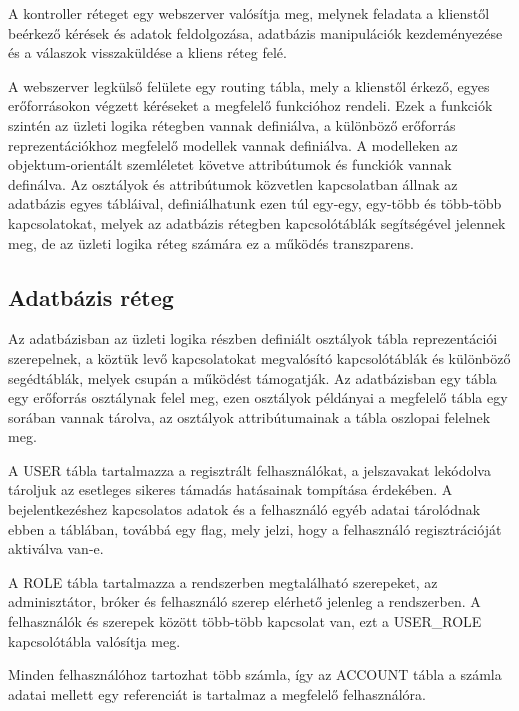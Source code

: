 A kontroller réteget egy webszerver valósítja meg, melynek feladata a klienstől beérkező kérések és adatok feldolgozása, adatbázis manipulációk kezdeményezése és a válaszok visszaküldése a kliens réteg felé.

A webszerver legkülső felülete egy routing tábla, mely a klienstől érkező, egyes erőforrásokon végzett kéréseket a megfelelő funkcióhoz rendeli. Ezek a funkciók szintén az üzleti logika rétegben vannak definiálva, a különböző erőforrás reprezentációkhoz megfelelő modellek vannak definiálva. A modelleken az objektum-orientált szemléletet követve attribútumok és funckiók vannak definálva. Az osztályok és attribútumok közvetlen kapcsolatban állnak az adatbázis egyes tábláival, definiálhatunk ezen túl egy-egy, egy-több és több-több kapcsolatokat, melyek az adatbázis rétegben kapcsolótáblák segítségével jelennek meg, de az üzleti logika réteg számára ez a működés transzparens.

\subsection{Adatbázis réteg}\label{sect:adatbazis_reteg}

Az adatbázisban az üzleti logika részben definiált osztályok tábla reprezentációi szerepelnek, a köztük levő kapcsolatokat megvalósító kapcsolótáblák és különböző segédtáblák, melyek csupán a működést támogatják. Az adatbázisban egy tábla egy erőforrás osztálynak felel meg, ezen osztályok példányai a megfelelő tábla egy sorában vannak tárolva, az osztályok attribútumainak a tábla oszlopai felelnek meg.

A USER tábla tartalmazza a regisztrált felhasználókat, a jelszavakat lekódolva tároljuk az esetleges sikeres támadás hatásainak tompítása érdekében. A bejelentkezéshez kapcsolatos adatok és a felhasználó egyéb adatai tárolódnak ebben a táblában, továbbá egy flag, mely jelzi, hogy a felhasználó regisztrációját aktiválva van-e.

A ROLE tábla tartalmazza a rendszerben megtalálható szerepeket, az adminisztátor, bróker és felhasználó szerep elérhető jelenleg a rendszerben. A felhasználók és szerepek között több-több kapcsolat van, ezt a USER\_ROLE kapcsolótábla valósítja meg. 

Minden felhasználóhoz tartozhat több számla, így az ACCOUNT tábla a számla adatai mellett egy referenciát is tartalmaz a megfelelő felhasználóra.

